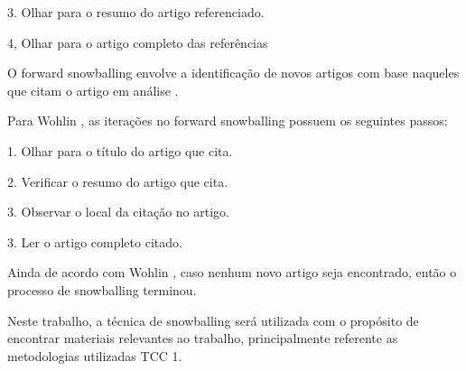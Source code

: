 3. Olhar para o resumo do artigo referenciado.

4, Olhar para o artigo completo das referências

O forward snowballing envolve a identificação de novos artigos com base naqueles que citam o artigo em análise \cite{wohlin2014guidelines}.

Para Wohlin \cite{wohlin2014guidelines}, as iterações no forward snowballing possuem os seguintes passos:

1. Olhar para o título do artigo que cita.

2. Verificar o resumo do artigo que cita.

3. Observar o local da citação no artigo.

3. Ler o artigo completo citado.

Ainda de acordo com Wohlin \cite{wohlin2014guidelines}, caso nenhum novo artigo seja encontrado, então o processo de snowballing terminou.

Neste trabalho, a técnica de snowballing será utilizada com o propósito de encontrar materiais relevantes ao trabalho, principalmente referente as metodologias utilizadas TCC 1.

